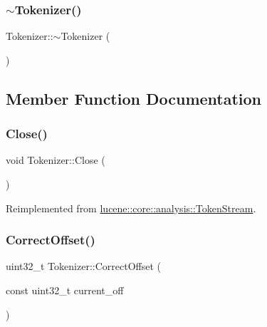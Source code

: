 \subsubsection{\texorpdfstring{$\sim$\+Tokenizer()}{~Tokenizer()}}
{\footnotesize\ttfamily Tokenizer\+::$\sim$\+Tokenizer (\begin{DoxyParamCaption}{ }\end{DoxyParamCaption})\hspace{0.3cm}{\ttfamily [virtual]}}



\subsection{Member Function Documentation}
\mbox{\label{classlucene_1_1core_1_1analysis_1_1Tokenizer_a95c3c0e37e3276be69fa0992b0e45e94}} 
\subsubsection{\texorpdfstring{Close()}{Close()}}
{\footnotesize\ttfamily void Tokenizer\+::\+Close (\begin{DoxyParamCaption}{ }\end{DoxyParamCaption})\hspace{0.3cm}{\ttfamily [virtual]}}



Reimplemented from \mbox{\hyperlink{classlucene_1_1core_1_1analysis_1_1TokenStream_ad7963391ddbb2c75610e3738ba5155c8}{lucene\+::core\+::analysis\+::\+Token\+Stream}}.

\mbox{\label{classlucene_1_1core_1_1analysis_1_1Tokenizer_a4c10a2cdbd688233cddb87151a8bf168}} 
\subsubsection{\texorpdfstring{Correct\+Offset()}{CorrectOffset()}}
{\footnotesize\ttfamily uint32\+\_\+t Tokenizer\+::\+Correct\+Offset (\begin{DoxyParamCaption}\item[{const uint32\+\_\+t}]{current\+\_\+off }\end{DoxyParamCaption})\hspace{0.3cm}{\ttfamily [protected]}}

